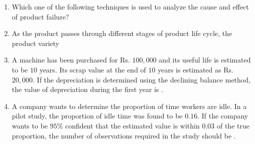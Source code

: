 \documentclass[journal,12pt,onecolumn]{IEEEtran}
\theoremstyle{remark}
\begin{document}
\begin{enumerate}
    \item Which one of the following techniques is used to analyze the cause and effect of product failure?
    
    \hfill{}
    \begin{enumerate}
    \end{enumerate}

    \item As the product passes through different stages of product life cycle, the product variety
    
    \hfill{}
    \begin{enumerate}
    \end{enumerate}

    \item A machine has been purchased for Rs. $100,000$ and its useful life is estimated to be $10$ years. Its scrap value at the end of $10$ years is estimated as Rs. $20,000$. If the depreciation is determined using the declining balance method, the value of depreciation  during the first year is \underline{\hspace{2cm}}.
    
    \hfill{}

    \item A company wants to determine the proportion of time workers are idle. In a pilot study, the proportion of idle time was found to be $0.16$. If the company wants to be $95\%$ confident  that the estimated value is within $0.03$ of the true proportion, the number of observations required in the study should be \underline{\hspace{2cm}}.
    

\end{enumerate}
\end{document}

